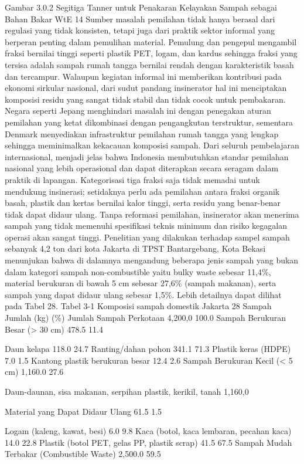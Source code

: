 \documentclass[
  letterpaper,
  DIV=11,
  numbers=noendperiod]{scrreprt}
\begin{document}
Gambar 3.0.2 Segitiga Tanner untuk Penakaran Kelayakan Sampah sebagai
Bahan Bakar WtE 14 Sumber masalah pemilahan tidak hanya berasal dari
regulasi yang tidak konsisten, tetapi juga dari praktik sektor informal
yang berperan penting dalam pemulihan material. Pemulung dan pengepul
mengambil fraksi bernilai tinggi seperti plastik PET, logam, dan kardus
sehingga fraksi yang tersisa adalah sampah rumah tangga bernilai rendah
dengan karakteristik basah dan tercampur. Walaupun kegiatan informal ini
memberikan kontribusi pada ekonomi sirkular nasional, dari sudut pandang
insinerator hal ini menciptakan komposisi residu yang sangat tidak
stabil dan tidak cocok untuk pembakaran. Negara seperti Jepang
menghindari masalah ini dengan penegakan aturan pemilahan yang ketat
dikombinasi dengan pengangkutan terstruktur, sementara Denmark
menyediakan infrastruktur pemilahan rumah tangga yang lengkap sehingga
meminimalkan kekacauan komposisi sampah. Dari seluruh pembelajaran
internasional, menjadi jelas bahwa Indonesia membutuhkan standar
pemilahan nasional yang lebih operasional dan dapat diterapkan secara
seragam dalam praktik di lapangan. Kategorisasi tiga fraksi saja tidak
memadai untuk mendukung insinerasi; setidaknya perlu ada pemilahan
antara fraksi organik basah, plastik dan kertas bernilai kalor tinggi,
serta residu yang benar-benar tidak dapat didaur ulang. Tanpa reformasi
pemilahan, insinerator akan menerima sampah yang tidak memenuhi
spesifikasi teknis minimum dan risiko kegagalan operasi akan sangat
tinggi. Penelitian yang dilakukan terhadap sampel sampah sebanyak 4,2
ton dari kota Jakarta di TPST Bantargebang, Kota Bekasi menunjukan bahwa
di dalamnya mengandung beberapa jenis sampah yang bukan dalam kategori
sampah non-combustible yaitu bulky waste sebesar 11,4\%, material
berukuran di bawah 5 cm sebesar 27,6\% (sampah makanan), serta sampah
yang dapat didaur ulang sebesar 1,5\%. Lebih detailnya dapat dilihat
pada Tabel 28. Tabel 3-1 Komposisi sampah domestik Jakarta 28 Sampah
Jumlah (kg) (\%) Jumlah Sampah Perkotaan 4,200,0 100.0 Sampah Berukuran
Besar (\textgreater{} 30 cm) 478.5 11.4

Daun kelapa 118.0 24.7 Ranting/dahan pohon 341.1 71.3 Plastik keras
(HDPE) 7.0 1.5 Kantong plastik berukuran besar 12.4 2.6 Sampah Berukuran
Kecil (\textless{} 5 cm) 1,160.0 27.6

Daun-daunan, sisa makanan, serpihan plastik, kerikil, tanah 1,160,0

Material yang Dapat Didaur Ulang 61.5 1.5

Logam (kaleng, kawat, besi) 6.0 9.8 Kaca (botol, kaca lembaran, pecahan
kaca) 14.0 22.8 Plastik (botol PET, gelas PP, plastik scrap) 41.5 67.5
Sampah Mudah Terbakar (Combustible Waste) 2,500.0 59.5
\end{document}
